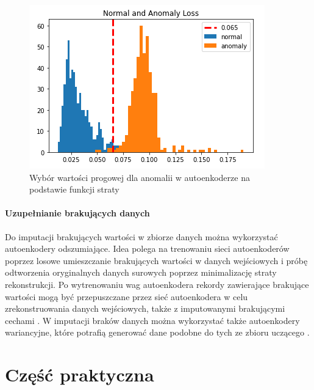 \documentclass[12pt]{mwbk}
\theoremstyle{plain}
\theoremstyle{definition}
\theoremstyle{remark}
\newcommand\zrodlo[1]{\par\vspace{-3mm}{\small\textit{Źródło: }#1 }}
\begin{document}
 \begin{figure}[!h]
 	\centering
 	\includegraphics[width=0.7\linewidth]{rys/anomaly_loss.png}
 	\caption{Wybór wartości progowej dla anomalii w autoenkoderze na podstawie funkcji straty}
 	\zrodlo{\cite{agrawal}}
 	\label{fig:anomaly_loss}
 \end{figure}

\newpage

\subsubsection{Uzupełnianie brakujących danych}

Do imputacji brakujących wartości w zbiorze danych można wykorzystać autoenkodery odszumiające. Idea polega na trenowaniu sieci autoenkoderów poprzez losowe umieszczanie brakujących wartości w danych wejściowych i próbę odtworzenia oryginalnych danych surowych poprzez minimalizację straty rekonstrukcji. Po wytrenowaniu wag autoenkodera rekordy zawierające brakujące wartości mogą być przepuszczane przez sieć autoenkodera w celu zrekonstruowania danych wejściowych, także z imputowanymi brakującymi cechami \cite{kumar}. W imputacji braków danych można wykorzystać także autoenkodery wariancyjne, które potrafią generować dane podobne do tych ze zbioru uczącego \cite{mccoy}.


\chapter{Część praktyczna}

\end{document}
